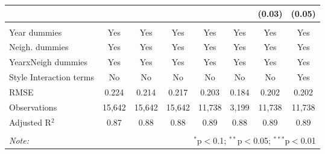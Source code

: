 \begin{table}[!htbp]
\begin{tabular}{@{\extracolsep{5pt}}lccccccc}
  &  &  &  &  &  & (0.03) & (0.05) \\ 
 \hline \\[-1.8ex] 
Year dummies & Yes & Yes & Yes & Yes & Yes & Yes & Yes \\ 
Neigh. dummies & Yes & Yes & Yes & Yes & Yes & Yes & Yes \\ 
YearxNeigh dummies & Yes & Yes & Yes & Yes & Yes & Yes & Yes \\ 
Style Interaction terms & No & No & No & No & No & No & Yes \\ 
RMSE & 0.224 & 0.214 & 0.217 & 0.203 & 0.184 & 0.202 & 0.202 \\ 
Observations & 15,642 & 15,642 & 15,642 & 11,738 & 3,199 & 11,738 & 11,738 \\ 
Adjusted R$^{2}$ & 0.87 & 0.88 & 0.88 & 0.89 & 0.88 & 0.89 & 0.89 \\ 
\hline 
\hline \\[-1.8ex] 
\textit{Note:}  & \multicolumn{7}{r}{$^{*}$p$<$0.1; $^{**}$p$<$0.05; $^{***}$p$<$0.01} \\ 
\end{tabular} 
\end{table} 
